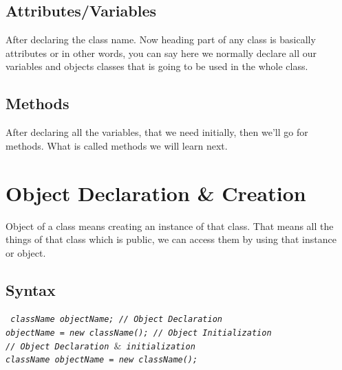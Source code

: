 \documentclass[openany]{book}  %
\begin{document}
\subsection{Attributes/Variables}
After declaring the class name. Now heading part of any class is basically \\
attributes or in other words, you can say here we normally declare all our \\
variables and objects classes that is going to be used in the whole class.
% 
% 
\subsection{Methods}
After declaring all the variables, that we need initially, then we'll go for \\
methods. What is called methods we will learn next.
% 
%
\section{Object Declaration \& Creation}
Object of a class means creating an instance of that class. That means all the \\
things of that class which is public, we can access them by using that instance \\
or object.
% 
% 
\subsection{Syntax}
\begin{center}
    \tt{
        \textit{className objectName; // Object Declaration\\
            objectName = new className(); // Object Initialization \\
            // Object Declaration $\&$ initialization\\
            className objectName = new className();\\
        }
    }
\end{center}
% 
% 
\end{document}

